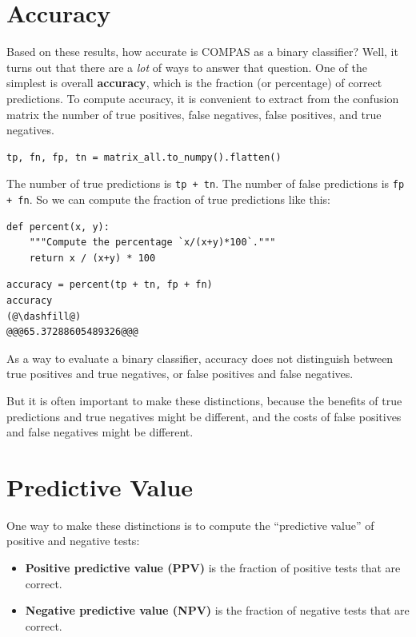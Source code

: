 \hypertarget{accuracy}{%
\section{Accuracy}\label{accuracy}}

Based on these results, how accurate is COMPAS as a binary classifier?
Well, it turns out that there are a \emph{lot} of ways to answer that
question. One of the simplest is overall \textbf{accuracy}, which is the
fraction (or percentage) of correct predictions. To compute accuracy, it
is convenient to extract from the confusion matrix the number of true
positives, false negatives, false positives, and true negatives.

\begin{lstlisting}[]
tp, fn, fp, tn = matrix_all.to_numpy().flatten()
\end{lstlisting}

The number of true predictions is \passthrough{\lstinline!tp + tn!}. The
number of false predictions is \passthrough{\lstinline!fp + fn!}. So we
can compute the fraction of true predictions like this:

\begin{lstlisting}[]
def percent(x, y):
    """Compute the percentage `x/(x+y)*100`."""
    return x / (x+y) * 100
\end{lstlisting}

\begin{lstlisting}[]
accuracy = percent(tp + tn, fp + fn)
accuracy
(@\dashfill@)
@@@65.37288605489326@@@
\end{lstlisting}

As a way to evaluate a binary classifier, accuracy does not distinguish
between true positives and true negatives, or false positives and false
negatives.

But it is often important to make these distinctions, because the
benefits of true predictions and true negatives might be different, and
the costs of false positives and false negatives might be different.

\hypertarget{predictive-value}{%
\section{Predictive Value}\label{predictive-value}}

One way to make these distinctions is to compute the ``predictive
value'' of positive and negative tests:

\begin{itemize}
\item
  \textbf{Positive predictive value (PPV)} is the fraction of positive
  tests that are correct.
\item
  \textbf{Negative predictive value (NPV)} is the fraction of negative
  tests that are correct.
\end{itemize}

